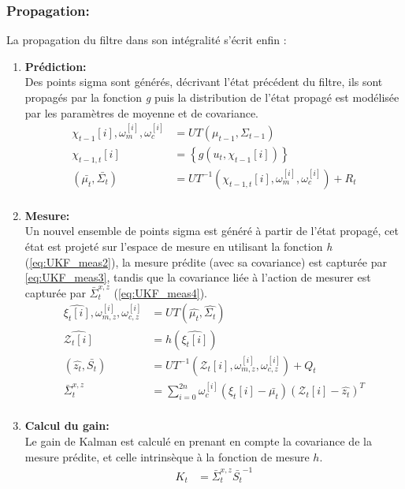 \subsubsection{Propagation:}
La propagation du filtre dans son intégralité s'écrit enfin :
\begin{enumerate}
	\item{\textbf{Prédiction:}}\\
	Des points sigma sont générés, décrivant l'état précédent du filtre, ils sont propagés par la fonction \emph{g} puis la distribution de l'état propagé est modélisée par les paramètres de moyenne et de covariance.
	\begin{align}
		\chi_{t-1}{[i]}, \omega_m^{[i]}, \omega_c^{[i]} &= UT(\mu_{t-1}, \Sigma_{t-1}) 			\label{eq:UKF_pred1}\\
		\chi_{t-1, t}{[i]}								&= \left\lbrace g(u_t, \chi_{t-1}{[i]})	\right\rbrace  	\label{eq:UKF_pred2}\\
		\left(\bar{\mu_t}, \bar{\Sigma_t} \right) 		&= UT^{-1}(\chi_{t-1, t}{[i]}, \omega_m^{[i]}, \omega_c^{[i]} ) + R_t \label{eq:UKF_pred3}\\	\nonumber
	\end{align}
	
	\item{\textbf{Mesure:}}\\
	Un nouvel ensemble de points sigma est généré à partir de l'état propagé, cet état est \og projeté\fg{} sur l'espace de mesure en utilisant la fonction \emph{h} (\ref{eq:UKF_meas2}), la mesure prédite (avec sa covariance) est capturée par \ref{eq:UKF_meas3}, tandis que la covariance liée à l'action de mesurer est capturée par $\bar{\Sigma}_t^{x,z}$ (\ref{eq:UKF_meas4}). 
	\begin{align}
		\hat{\xi_{t}{[i]}}, \omega_{m,z}^{[i]}, \omega_{c,z}^{[i]}	&= UT(\hat{\mu_t}, \hat{\Sigma_t})	\label{eq:UKF_meas1}\\
		\hat{\mathcal{Z}_{t}{[i]}}	&= h(\hat{ \xi_{t}{[i]} }) \label{eq:UKF_meas2}\\
		\left(\hat{z_t}, \bar{S_t} \right) &= UT^{-1}( \mathcal{Z}_{t}{[i]}, \omega_{m,z}^{[i]}, \omega_{c,z}^{[i]} ) + Q_t 		\label{eq:UKF_meas3}\\
		\bar{\Sigma}_t^{x,z} &= \sum\limits_{i=0}^{2n} \omega_c^{[i]} \left( \xi_{t}{[i]} - \bar{\mu_t} \right) \left( \mathcal{Z}_{t}{[i]} - \hat{z_t}\right)^T	\label{eq:UKF_meas4}\\	\nonumber
	\end{align}
	
	\item{\textbf{Calcul du gain:}}\\
	Le gain de Kalman est calculé en prenant en compte la covariance de la mesure prédite, et celle intrinsèque à la fonction de mesure $h$.
	\begin{align}
		K_t &= \bar{\Sigma}_t^{x,z} \bar{S_t}^{-1} 		\label{eq:UKF_prop1}\\ \nonumber
	\end{align}
	

\end{enumerate}
